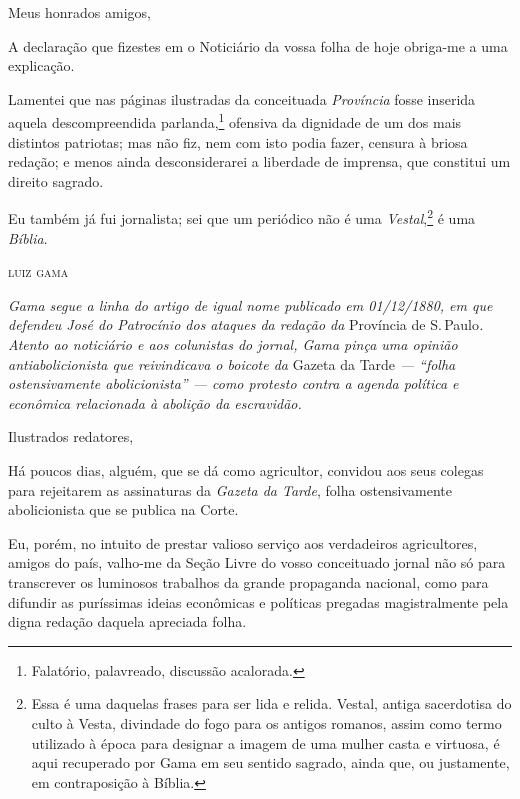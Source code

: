 Meus honrados amigos,

A declaração que fizestes em o Noticiário da vossa folha de hoje
obriga-me a uma explicação.

Lamentei que nas páginas ilustradas da conceituada \emph{Província}
fosse inserida aquela descompreendida parlanda,\footnote{Falatório,
  palavreado, discussão acalorada.} ofensiva da dignidade de um dos mais
distintos patriotas; mas não fiz, nem com isto podia fazer, censura à
briosa redação; e menos ainda desconsiderarei a liberdade de imprensa,
que constitui um direito sagrado.

Eu também já fui jornalista; sei que um periódico não é uma
\emph{Vestal},\footnote{Essa é uma daquelas frases para ser lida e relida.
  Vestal, antiga sacerdotisa do culto à Vesta, divindade do fogo para os
  antigos romanos, assim como termo utilizado à época para designar a
  imagem de uma mulher casta e virtuosa, é aqui recuperado por Gama em
  seu sentido sagrado, ainda que, ou justamente, em contraposição à
  Bíblia.} é uma \emph{Bíblia}.\medskip

\hfill\textsc{luiz gama}


\begin{resumo}
\emph{Gama segue a linha do artigo de igual nome publicado em
01/12/1880, em que defendeu José do Patrocínio dos ataques da redação
da} Província de S.\,Paulo\emph{. Atento ao noticiário e aos colunistas
do jornal, Gama pinça uma opinião antiabolicionista que reivindicava o
boicote da} Gazeta da Tarde \emph{--- ``folha ostensivamente
abolicionista'' --- como protesto contra a agenda política e econômica
relacionada à abolição da escravidão. }
\end{resumo}

Ilustrados redatores,

Há poucos dias, alguém, que se dá como agricultor, convidou aos seus
colegas para rejeitarem as assinaturas da \emph{Gazeta da Tarde}, folha
ostensivamente abolicionista que se publica na Corte.

Eu, porém, no intuito de prestar valioso serviço aos verdadeiros
agricultores, amigos do país, valho-me da Seção Livre do vosso
conceituado jornal não só para transcrever os luminosos trabalhos da
grande propaganda nacional, como para difundir as puríssimas ideias
econômicas e políticas pregadas magistralmente pela digna redação
daquela apreciada folha.

